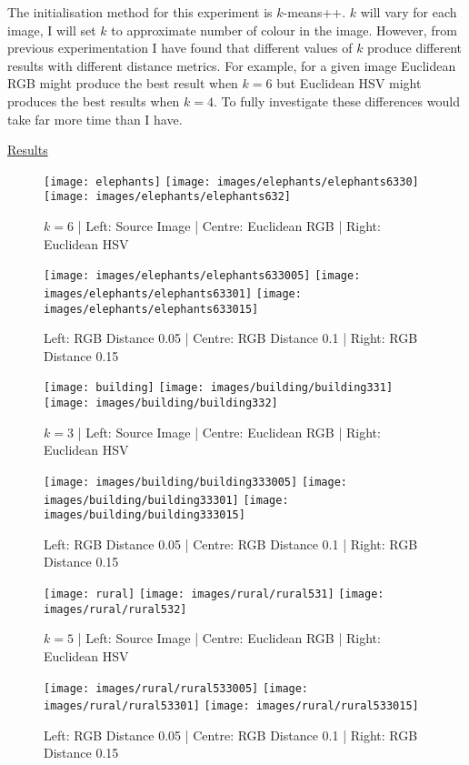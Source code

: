 \documentclass{article}
\begin{document}
The initialisation method for this experiment is $k$-means++. $k$ will vary for each image, I will set $k$ to approximate number of colour in the image. However, from previous experimentation I have found that different values of $k$ produce different results with different distance metrics. For example, for a given image Euclidean RGB might produce the best result when $k = 6$ but Euclidean HSV might produces the best results when $k = 4$. To fully investigate these differences would take far more time than I have. 

\underline{Results}

\begin{figure}[H]
\begin{center}
\texttt{[image: elephants]}
\texttt{[image: images/elephants/elephants6330]}
\texttt{[image: images/elephants/elephants632]}
\caption{$k = 6$ | Left: Source Image | Centre: Euclidean RGB | Right: Euclidean HSV }
\texttt{[image: images/elephants/elephants633005]}
\texttt{[image: images/elephants/elephants63301]}
\texttt{[image: images/elephants/elephants633015]}
\caption{Left: RGB Distance 0.05 | Centre: RGB Distance 0.1 | Right: RGB Distance 0.15 }
\end{center}
\end{figure}

\begin{figure}[H]
\begin{center}
\texttt{[image: building]}
\texttt{[image: images/building/building331]}
\texttt{[image: images/building/building332]}
\caption{$k = 3$ | Left: Source Image | Centre: Euclidean RGB | Right: Euclidean HSV }
\texttt{[image: images/building/building333005]}
\texttt{[image: images/building/building33301]}
\texttt{[image: images/building/building333015]}
\caption{Left: RGB Distance 0.05 | Centre: RGB Distance 0.1 | Right: RGB Distance 0.15 }
\end{center}
\end{figure}

\begin{figure}[H]
\begin{center}
\texttt{[image: rural]}
\texttt{[image: images/rural/rural531]}
\texttt{[image: images/rural/rural532]}
\caption{$k = 5$ | Left: Source Image | Centre: Euclidean RGB | Right: Euclidean HSV }
\texttt{[image: images/rural/rural533005]}
\texttt{[image: images/rural/rural53301]}
\texttt{[image: images/rural/rural533015]}
\caption{Left: RGB Distance 0.05 | Centre: RGB Distance 0.1 | Right: RGB Distance 0.15 }
\end{center}
\end{figure}
\end{document}
